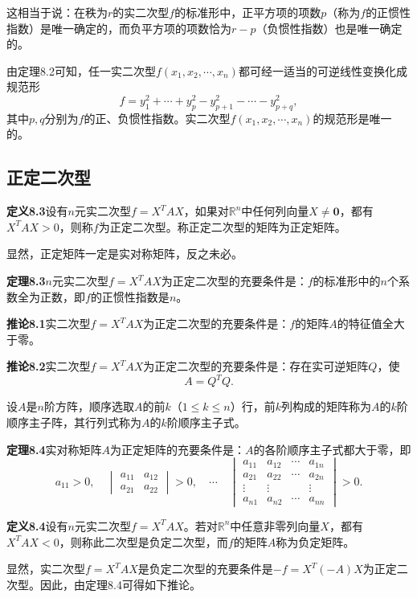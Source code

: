 这相当于说：在秩为$r$的实二次型$f$的标准形中，正平方项的项数$p$（称为$f$的正惯性指数）是唯一确定的，而负平方项的项数恰为$r-p$（负惯性指数）也是唯一确定的。

由定理8.2可知，任一实二次型$f(x_1,x_2,\cdots,x_n)$都可经一适当的可逆线性变换化成规范形
\[
f=y_1^2+\cdots+y_p^2-y_{p+1}^2-\cdots-y_{p+q}^2,
\]
其中$p,q$分别为$f$的正、负惯性指数。实二次型$f(x_1,x_2,\cdots,x_n)$的规范形是唯一的。

\subsection{正定二次型}
\textbf{定义8.3}\quad 设有$n$元实二次型$f=X^TAX$，如果对$\mathbb{R}^n$中任何列向量$X\neq \boldsymbol{0}$，都有$X^TAX>0$，则称$f$为正定二次型。称正定二次型的矩阵为正定矩阵。

显然，正定矩阵一定是实对称矩阵，反之未必。

\textbf{定理8.3}\quad $n$元实二次型$f=X^TAX$为正定二次型的充要条件是：$f$的标准形中的$n$个系数全为正数，即$f$的正惯性指数是$n$。

\textbf{推论8.1}\quad 实二次型$f=X^TAX$为正定二次型的充要条件是：$f$的矩阵$A$的特征值全大于零。

\textbf{推论8.2}\quad 实二次型$f=X^TAX$为正定二次型的充要条件是：存在实可逆矩阵$Q$，使
\[
A=Q^TQ.
\]

设$A$是$n$阶方阵，顺序选取$A$的前$k$（$1\le k\le n$）行，前$k$列构成的矩阵称为$A$的$k$阶顺序主子阵，其行列式称为$A$的$k$阶顺序主子式。

\textbf{定理8.4}\quad 实对称矩阵$A$为正定矩阵的充要条件是：$A$的各阶顺序主子式都大于零，即
\[
a_{11}>0,\quad
\begin{vmatrix}a_{11}&a_{12}\\a_{21}&a_{22}\end{vmatrix}>0,\quad
\cdots\quad
\begin{vmatrix}
a_{11}&a_{12}&\cdots&a_{1n}\\
a_{21}&a_{22}&\cdots&a_{2n}\\
\vdots&\vdots&&\vdots\\
a_{n1}&a_{n2}&\cdots&a_{nn}
\end{vmatrix}>0.
\]

\textbf{定义8.4}\quad 设有$n$元实二次型$f=X^TAX$。若对$\mathbb{R}^n$中任意非零列向量$X$，都有$X^TAX<0$，则称此二次型是负定二次型，而$f$的矩阵$A$称为负定矩阵。

显然，实二次型$f=X^TAX$是负定二次型的充要条件是$-f=X^T(-A)X$为正定二次型。因此，由定理8.4可得如下推论。

